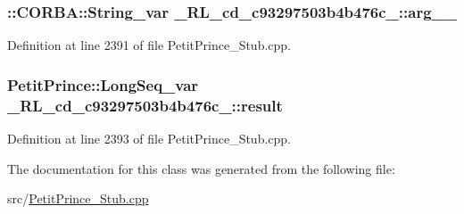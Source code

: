 \subsubsection[{\texorpdfstring{arg\+\_\+0\+\_\+}{arg_0_}}]{\setlength{\rightskip}{0pt plus 5cm}\+::C\+O\+R\+B\+A\+::\+String\+\_\+var \+\_\+R\+L\+\_\+cd\+\_\+c93297503b4b476c\+\_\+::arg\+\_\+\_\+}\hypertarget{class__0_r_l__cd__c93297503b4b476c__71000000_a6c99db7522f081f5f960329aa52f2939}{}\label{class__0_r_l__cd__c93297503b4b476c__71000000_a6c99db7522f081f5f960329aa52f2939}


Definition at line 2391 of file Petit\+Prince\+\_\+\+Stub.\+cpp.

\subsubsection[{\texorpdfstring{result}{result}}]{\setlength{\rightskip}{0pt plus 5cm}Petit\+Prince\+::\+Long\+Seq\+\_\+var \+\_\+R\+L\+\_\+cd\+\_\+c93297503b4b476c\+\_\+::result}\hypertarget{class__0_r_l__cd__c93297503b4b476c__71000000_af3a56f469452c58aa0b15ff954198b07}{}\label{class__0_r_l__cd__c93297503b4b476c__71000000_af3a56f469452c58aa0b15ff954198b07}


Definition at line 2393 of file Petit\+Prince\+\_\+\+Stub.\+cpp.



The documentation for this class was generated from the following file\+:\begin{DoxyCompactItemize}
\item 
src/\hyperlink{_petit_prince___stub_8cpp}{Petit\+Prince\+\_\+\+Stub.\+cpp}\end{DoxyCompactItemize}

